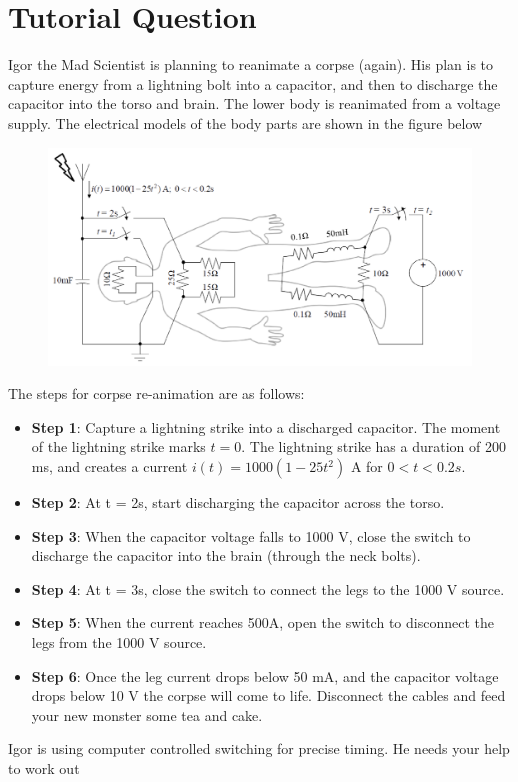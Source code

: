 \section{Tutorial Question}
    Igor the Mad Scientist is planning to reanimate a corpse (again). His plan is to capture energy
    from a lightning bolt into a capacitor, and then to discharge the capacitor into the torso and
    brain. The lower body is reanimated from a voltage supply. The electrical models of the body
    parts are shown in the figure below
    \begin{figure}[H]
        \centering
        \includegraphics[width=0.6\linewidth]{tutorials/figures/frankenstein.png}
    \end{figure}
    The steps for corpse re-animation are as follows:
    \begin{itemize}
        \item \textbf{Step 1}: Capture a lightning strike into a discharged capacitor. The moment of the lightning
        strike marks $t = 0$. The lightning strike has a duration of 200 ms, and creates a current $i(t) =
        1000(1 - 25t^2)$ A for $0 < t < 0.2s$.
        \item \textbf{Step 2}: At t = 2s, start discharging the capacitor across the torso.
        \item \textbf{Step 3}: When the capacitor voltage falls to 1000 V, close the switch to discharge the capacitor
        into the brain (through the neck bolts).
        \item \textbf{Step 4}: At t = 3s, close the switch to connect the legs to the 1000 V source.
        \item \textbf{Step 5}: When the current reaches 500A, open the switch to disconnect the legs from the 1000 V
        source.
        \item \textbf{Step 6}: Once the leg current drops below 50 mA, and the capacitor voltage drops below 10 V
        the corpse will come to life. Disconnect the cables and feed your new monster some tea and
        cake.
    \end{itemize}
    Igor is using computer controlled switching for precise timing. He needs your help to work out
